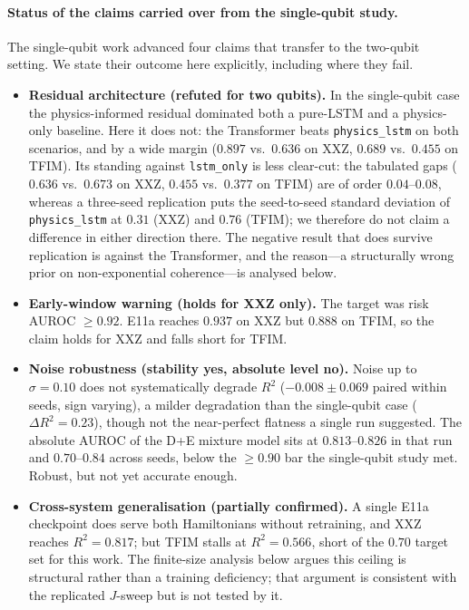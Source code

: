 \documentclass[twocolumn,10pt]{article}
\begin{document}
\paragraph{Status of the claims carried over from the single-qubit study.}
The single-qubit work \cite{Paper1Brusnikin} advanced four claims that
transfer to the two-qubit setting.
We state their outcome here explicitly, including where they fail.
\begin{itemize}
  \item \textbf{Residual architecture (refuted for two qubits).}
    In the single-qubit case the physics-informed residual dominated
    both a pure-LSTM and a physics-only baseline.
    Here it does not: the Transformer beats \texttt{physics\_lstm} on
    both scenarios, and by a wide margin ($0.897$ vs.\ $0.636$ on XXZ,
    $0.689$ vs.\ $0.455$ on TFIM).
    Its standing against \texttt{lstm\_only} is less clear-cut: the
    tabulated gaps ($0.636$ vs.\ $0.673$ on XXZ, $0.455$ vs.\ $0.377$
    on TFIM) are of order $0.04$--$0.08$, whereas a three-seed
    replication puts the seed-to-seed standard deviation of
    \texttt{physics\_lstm} at $0.31$ (XXZ) and $0.76$ (TFIM); we
    therefore do not claim a difference in either direction there.
    The negative result that does survive replication is against the
    Transformer, and the reason---a structurally wrong prior on
    non-exponential coherence---is analysed below.
  \item \textbf{Early-window warning (holds for XXZ only).}
    The target was risk AUROC $\geq 0.92$.
    E11a reaches $0.937$ on XXZ but $0.888$ on TFIM, so the claim holds
    for XXZ and falls short for TFIM.
  \item \textbf{Noise robustness (stability yes, absolute level no).}
    Noise up to $\sigma = 0.10$ does not systematically degrade $R^2$
    ($-0.008 \pm 0.069$ paired within seeds, sign varying), a milder
    degradation than the single-qubit case ($\Delta R^2 = 0.23$),
    though not the near-perfect flatness a single run suggested.
    The absolute AUROC of the D+E mixture model sits at
    $0.813$--$0.826$ in that run and $0.70$--$0.84$ across seeds, below
    the $\geq 0.90$ bar the single-qubit study met.
    Robust, but not yet accurate enough.
  \item \textbf{Cross-system generalisation (partially confirmed).}
    A single E11a checkpoint does serve both Hamiltonians without
    retraining, and XXZ reaches $R^2 = 0.817$; but TFIM stalls at
    $R^2 = 0.566$, short of the $0.70$ target set for this work.
    The finite-size analysis below argues this ceiling is structural
    rather than a training deficiency; that argument is consistent with
    the replicated $J$-sweep but is not tested by it.
\end{itemize}
\end{document}
